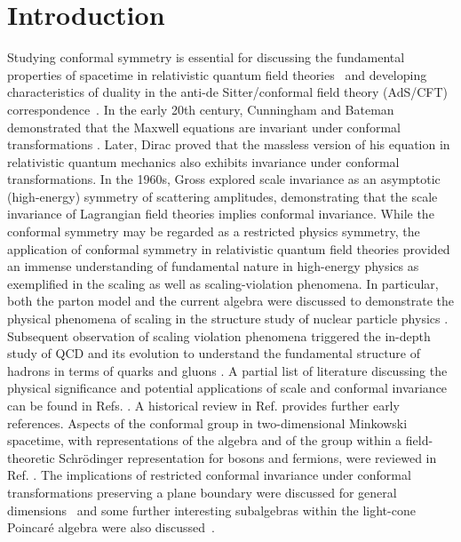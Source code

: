 \documentclass[foundations,article,submit,pdftex,moreauthors]{Definitions/mdpi}
\begin{document}
\section{Introduction}
\label{sec:introduction}


Studying conformal symmetry is essential for discussing the fundamental properties of spacetime in relativistic quantum field theories~\cite{Wess1960, Kastrup1966, SalamMack1969, Gross1970} and developing characteristics of duality in the anti-de Sitter/conformal field theory (AdS/CFT) correspondence~\cite {Weinberg_2010, Brodsky_2015, Maldacena2016}. In the early 20th century, Cunningham  \cite{Cunningham1910} and Bateman  \cite{Bateman1910} demonstrated that the Maxwell equations are invariant under conformal transformations \cite{Kastrup2008}. Later, Dirac \cite{Dirac1936} proved that the massless version of his equation in relativistic quantum mechanics also exhibits invariance under conformal transformations. In the 1960s, Gross \cite{Gross1970} explored scale invariance as an asymptotic (high-energy) symmetry of scattering amplitudes, demonstrating that the scale invariance of Lagrangian field theories implies conformal invariance. 
{
While the conformal symmetry may be regarded {\color{blue}as} a restricted physics symmetry, the application of conformal symmetry in relativistic quantum field theories provided an immense understanding of fundamental nature in high-energy physics as exemplified in the scaling as well as scaling-violation phenomena. In particular, both the parton model and the current algebra were discussed to demonstrate the physical phenomena of scaling in the structure study of nuclear particle physics \cite{PhysRevLett.23.935, PhysRevLett.23.930, PhysRev.179.1547, PhysRevLett.23.1415, PhysRev.185.1975, PhysRevLett.22.156, PhysRev.179.1499}. Subsequent observation of scaling violation phenomena triggered the in-depth study of QCD and its evolution to understand the fundamental structure of hadrons in terms of quarks and gluons \cite{Altarelli:1977zs}.}
A partial list of literature discussing the physical significance and potential applications of scale and conformal invariance can be found in Refs. \cite{Wess1960, Gürsey1956, Fulton1962, Kastrup1966, SalamMack1969, PhysRev.179.1499, Gross1970}. A historical review in Ref. \cite{Kastrup2008} provides further early references. Aspects of the conformal group in two-dimensional Minkowski spacetime, with representations of the algebra and of the group within a field-theoretic Schrödinger representation for bosons and fermions, were reviewed in Ref. \cite{Jackiw1990}. { The implications of restricted conformal invariance under conformal transformations preserving a plane boundary were discussed for general dimensions~\cite{McAvity:1995zd} and 
some further interesting subalgebras within the light-cone Poincar\'e algebra were also discussed~\cite{majumdar2025carrolliannaturelight}.}
\end{document}
